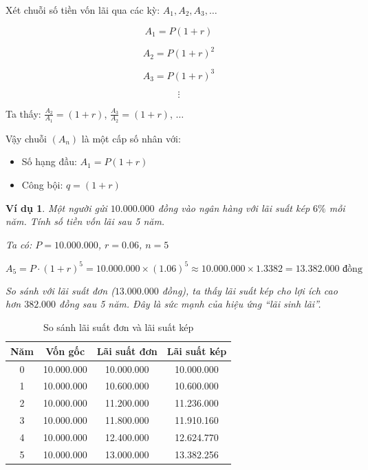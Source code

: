 \documentclass[12pt,a4paper]{report}
\newtheorem{example}{Ví dụ}[section]
\begin{document}
Xét chuỗi số tiền vốn lãi qua các kỳ:
$A_1, A_2, A_3, \dots$

\[
    A_1 = P(1 + r)
\]

\[
    A_2 = P(1 + r)^2
\]

\[
    A_3 = P(1 + r)^3
\]

\[
    \vdots
\]

Ta thấy:
$\frac{A_2}{A_1} = (1 + r)$,
$\frac{A_3}{A_2} = (1 + r)$,
$\dots$

Vậy chuỗi $(A_n)$ là một cấp số nhân với:

\begin{itemize}[label=\textbullet]
    \item Số hạng đầu: $A_1 = P(1 + r)$
    \item Công bội: $q = (1 + r)$
\end{itemize}

\begin{example}
    Một người gửi $10.000.000$ đồng vào ngân hàng với lãi suất kép $6\%$ mỗi năm. Tính số tiền vốn lãi sau 5 năm.
    
    Ta có:
    $P = 10.000.000$,
    $r = 0.06$,
    $n = 5$
    
    \[
        A_5
        = P \cdot (1 + r)^5
        = 10.000.000 \times (1.06)^5
        \approx 10.000.000 \times 1.3382
        = 13.382.000 \text{ đồng}
    \]
    
    So sánh với lãi suất đơn ($13.000.000$ đồng), ta thấy lãi suất kép cho lợi ích cao hơn $382.000$ đồng sau 5 năm. Đây là sức mạnh của hiệu ứng ``lãi sinh lãi''.
\end{example}

\begin{table}[htbp]
    \centering
    \caption{So sánh lãi suất đơn và lãi suất kép}
    \vspace{0.3cm}
    
    \begin{tabular}{|c|c|c|c|}
        \hline
        \textbf{Năm} & \textbf{Vốn gốc} &
        \textbf{Lãi suất đơn} & \textbf{Lãi suất kép} \\
        \hline
        0 & 10.000.000 & 10.000.000 & 10.000.000 \\
        \hline
        1 & 10.000.000 & 10.600.000 & 10.600.000 \\
        \hline
        2 & 10.000.000 & 11.200.000 & 11.236.000 \\
        \hline
        3 & 10.000.000 & 11.800.000 & 11.910.160 \\
        \hline
        4 & 10.000.000 & 12.400.000 & 12.624.770 \\
        \hline
        5 & 10.000.000 & 13.000.000 & 13.382.256 \\
        \hline
    \end{tabular}
\end{table}
\end{document}
